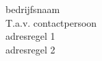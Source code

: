 \documentclass{aesbrief}
\begin{document}
\cienaam{}
\datum{\today}
\uwk{} %
\onsk{} %
\email{} %
\subject{} %

\begin{factuurbrief}{
bedrijfsnaam\\
T.a.v. contactpersoon\\
adresregel 1\\ %
adresregel 2\\ %
}




\end{factuurbrief}
\end{document}
